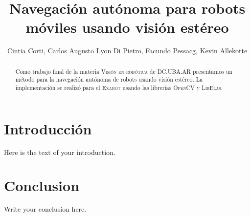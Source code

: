 \documentclass[journal,a4paper]{IEEEtran}
\begin{document}
\title{Navegación autónoma para robots móviles usando visión estéreo}
\author{Cintia Corti, Carlos Augusto Lyon Di Pietro, Facundo Pessacg, Kevin Allekotte}

\maketitle

\begin{abstract}
Como trabajo final de la materia \textsc{Visión en robótica} de \textsc{DC.UBA.AR}
presentamos un método para la navegación autónoma de robots usando visión estéreo.
La implementación se realizó para el \textsc{Exabot} usando las librerías \textsc{OpenCV} y \textsc{LibElas}.
\end{abstract}

\section{Introducción}
Here is the text of your introduction.


\section{Conclusion}
Write your conclusion here.
\end{document}
